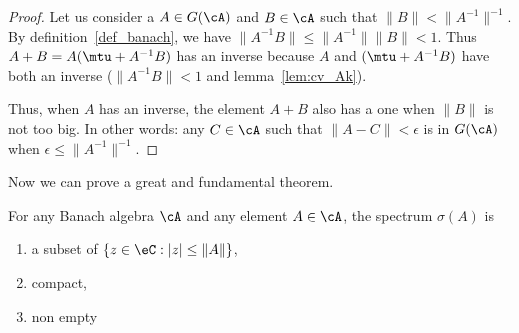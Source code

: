 \begin{proof}
	Let us consider a $A\in G(\cA)$ and $B\in\cA$ such that $\|B\|<\|A^{-1}\|^{-1}$. By definition~\ref{def_banach}, we have $\|A^{-1} B\|\leq\|A^{-1}\|\|B\|<1$. Thus $A+B=A(\mtu+A^{-1} B)$ has an inverse because $A$ and $(\mtu+A^{-1} B)$ have both an inverse ($\|A^{-1} B\|<1$ and lemma~\ref{lem:cv_Ak}).

	Thus, when $A$ has an inverse, the element $A+B$ also has a one when $\|B\|$ is not too big. In other words: any $C\in\cA$ such that $\|A-C\|<\epsilon$ is in $G(\cA)$ when $\epsilon\leq\|A^{-1}\|^{-1}$.
\end{proof}

Now we can prove a great and fundamental theorem.

\begin{theorem}			\label{ThoSpecBanach}
    For any Banach algebra $\cA$ and any element $A\in\cA$, the spectrum $\sigma(A)$ is
    \begin{enumerate}
        \item       \label{ItemThoSpecBanachi}
            a subset of $\{z\in\eC:|z|\leq\|A\|\}$,
        \item
            compact,
        \item
            non empty
        \end{enumerate}
\end{theorem} \label{tho:prop_sigma}

